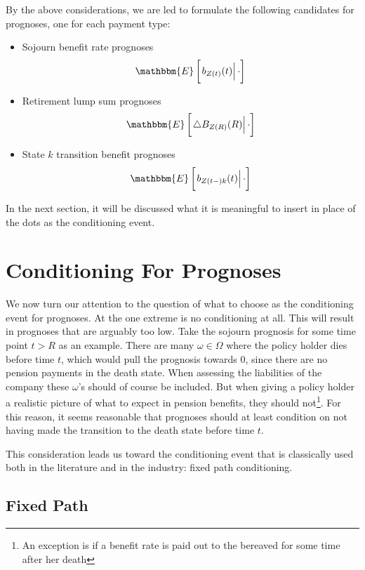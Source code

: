 \documentclass{book}
\newcommand{\1}[1]{\mathbbm{1}_{\left\lbrace #1 \right\rbrace}}
\newcommand{\econd}[2][def]{\mathbbm{E} \left[ \left. #1 \right| #2 \right]}
\theoremstyle{break}
\theoremstyle{remark}
\numberwithin{equation}{section}
\begin{document}
By the above considerations, we are led to formulate the following candidates for prognoses, one for each payment type:

\begin{itemize}
    \item Sojourn benefit rate prognoses
    \begin{align*}
        \econd[b_{Z(t)}(t)]{\cdot}
    \end{align*}
    \item Retirement lump sum prognoses
    \begin{align*}
        \econd[\triangle B_{Z(R)}(R)]{\cdot}
    \end{align*}
    \item State $k$ transition benefit prognoses
    \begin{align*}
        \econd[b_{Z(t-)k}(t)]{\cdot}
    \end{align*}
\end{itemize}

In the next section, it will be discussed what it is meaningful to insert in place of the dots as the conditioning event.

\section{Conditioning For Prognoses} \label{CondForProg}

We now turn our attention to the question of what to choose as the conditioning event for prognoses. At the one extreme is no conditioning at all. This will result in prognoses that are arguably too low. Take the sojourn prognosis for some time point $t>R$ as an example. There are many $\omega \in \Omega$ where the policy holder dies before time $t$, which would pull the prognosis towards 0, since there are no pension payments in the death state. When assessing the liabilities of the company these $\omega$'s should of course be included. But when giving a policy holder a realistic picture of what to expect in pension benefits, they should not\footnote{An exception is if a benefit rate is paid out to the bereaved for some time after her death}. For this reason, it seems reasonable that prognoses should at least condition on not having made the transition to the death state before time $t$.

This consideration leads us toward the conditioning event that is classically used both in the literature and in the industry: fixed path conditioning.

\subsection{Fixed Path}
\end{document}
